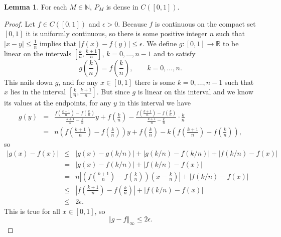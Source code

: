 \documentclass{article}
\newcommand{\norm}[1]{\left\Vert #1 \right\Vert}
\theoremstyle{definition}
\newtheorem{lemma}[theorem]{Lemma}
\theoremstyle{definition}
\begin{document}
\begin{lemma}
For each $M \in \mathbb{N}$, $P_M$ is dense in $C([0,1])$. 
\end{lemma}
\begin{proof}
Let $f \in C([0,1])$ and $\epsilon>0$. Because $f$ is continuous on the compact set $[0,1]$ it is uniformly continuous, so there is some
positive integer $n$ such that $|x-y| \leq \frac{1}{n}$ implies that $|f(x)-f(y)| \leq \epsilon$. We define $g:[0,1] \to \mathbb{R}$
to be linear on the intervals $[\frac{k}{n},\frac{k+1}{n}]$, $k=0,\ldots,n-1$ and to satisfy
\[
g\left(\frac{k}{n}\right)=f\left(\frac{k}{n}\right), \qquad k=0,\ldots,n.
\]
This nails down $g$, and for any $x \in [0,1]$ there is some $k=0,\ldots,n-1$ such that $x$ lies in the interval $[\frac{k}{n},  \frac{k+1}{n}]$.
But since $g$ is linear on this interval and we know its values at the endpoints, for any $y$ in this interval we have
\begin{eqnarray*}
g(y)& =& \frac{f\left(\frac{k+1}{n}\right)-f\left(\frac{k}{n}\right)}{\frac{k+1}{n}-\frac{k}{n}} y + f\left(\frac{k}{n}\right)-
 \frac{f\left(\frac{k+1}{n}\right)-f\left(\frac{k}{n}\right)}{\frac{k+1}{n}-\frac{k}{n}} \cdot \frac{k}{n}\\
 &=&n\left(f\left(\frac{k+1}{n}\right)-f\left(\frac{k}{n}\right)\right)y +f\left(\frac{k}{n}\right) - k\left(f\left(\frac{k+1}{n}\right)-f\left(\frac{k}{n}\right)\right),
\end{eqnarray*}
so 
\begin{eqnarray*}
|g(x)-f(x)| &\leq& |g(x)-g(k/n)|+|g(k/n)-f(k/n)| +|f(k/n)-f(x)|\\
&=&|g(x)-f(k/n)|+|f(k/n)-f(x)|\\
&=&n\left|\left(f\left(\frac{k+1}{n}\right)-f\left(\frac{k}{n}\right)\right)\left(x- \frac{k}{n}\right)\right|+|f(k/n)-f(x)|\\
&\leq&\left|f\left(\frac{k+1}{n}\right)-f\left(\frac{k}{n}\right)\right|+|f(k/n)-f(x)|\\
&\leq&2\epsilon.
\end{eqnarray*}
This is true for all $x \in [0,1]$, so
\[
\norm{g-f}_\infty \leq 2\epsilon.
\]


\end{proof}
\end{document}
